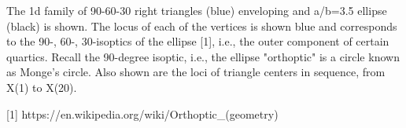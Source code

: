 The 1d family of 90-60-30 right triangles (blue) enveloping and a/b=3.5 ellipse (black) is shown. The locus of each of the vertices is shown blue and corresponds to the 90-, 60-, 30-isoptics of the ellipse [1], i.e., the outer component of certain quartics. Recall the 90-degree isoptic, i.e., the ellipse "orthoptic" is a circle known as Monge's circle. Also shown are the loci of triangle centers in sequence, from X(1) to X(20).

[1] https://en.wikipedia.org/wiki/Orthoptic_(geometry)